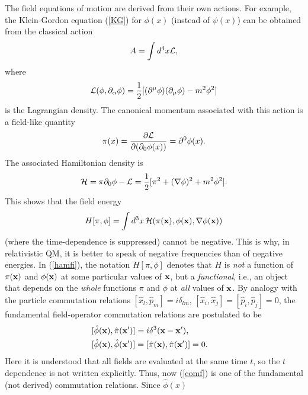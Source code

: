 \documentclass[12pt]{article}
\begin{document}
The field equations of motion are derived from their own
actions. For example, the Klein-Gordon equation (\ref{KG})
for $\phi(x)$ (instead of $\psi(x)$)
can be obtained from the classical action
\begin{equation} 
A=\int d^4x {\cal L} ,
\end{equation}
where
\begin{equation}\label{lagr}
{\cal L}(\phi,\partial_{\alpha}\phi)=
\frac{1}{2} [(\partial^{\mu}\phi)(\partial_{\mu}\phi)
-m^2\phi^2 ]    
\end{equation}
is the Lagrangian density. The canonical momentum associated
with this action is a field-like quantity
\begin{equation}
\pi(x)=\frac{\partial{\cal L}}{\partial (\partial_0\phi(x))}
=\partial^0\phi(x) .
\end{equation}
The associated Hamiltonian density is
\begin{equation}\label{hamden}
{\cal H}=\pi \partial_0\phi - {\cal L}=
\frac{1}{2} [\pi^2 + (\nabla\phi)^2 +m^2\phi^2] .
\end{equation}
This shows that the field energy 
\begin{equation}\label{hamfi}
H[\pi,\phi]=\int d^3x\, {\cal H}(\pi({\bf x}),\phi({\bf x}),
\nabla\phi({\bf x}) ) 
\end{equation}
(where the time-dependence is suppressed)
cannot be negative. 
This is why, in relativistic QM, it is better to speak
of negative frequencies than of negative energies.
In (\ref{hamfi}), the notation $H[\pi,\phi]$ denotes 
that $H$ is {\em not} a function of 
$\pi({\bf x})$ and $\phi({\bf x})$ at some particular values of 
${\bf x}$, but a {\em functional}, i.e., an object that 
depends on the {\em whole} functions $\pi$ and $\phi$ at
{\em all} values of ${\bf x}$.
By analogy with the particle commutation relations
$[\hat{x}_l,\hat{p}_m]=i\delta_{lm}$, 
$[\hat{x}_i,\hat{x}_j]=[\hat{p}_i,\hat{p}_j]=0$, 
the fundamental field-operator commutation relations are
postulated to be
\begin{eqnarray}\label{comfund}
& [\hat{\phi}({\bf x}),\hat{\pi}({\bf x}')]=i\delta^3({\bf x}-{\bf x}') , &
\nonumber \\
& [\hat{\phi}({\bf x}),\hat{\phi}({\bf x}')]=
[\hat{\pi}({\bf x}),\hat{\pi}({\bf x}')]=0 .
\end{eqnarray} 
Here it is understood that all fields are evaluated at the same time $t$, 
so the $t$ dependence is not written explicitly.
Thus, now (\ref{comf}) is one of the fundamental (not derived) 
commutation relations. Since $\hat{\phi}(x)$ 
\end{document}
